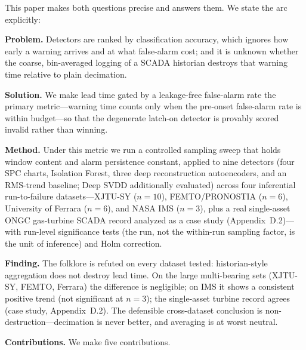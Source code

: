 \documentclass[IJPHM, 2026, 0]{PHMSociety}
\begin{document}
This paper makes both questions precise and answers them. We state the arc explicitly:

\textbf{Problem.} Detectors are ranked by classification accuracy, which ignores how early a warning arrives and at what false-alarm cost; and it is unknown whether the coarse, bin-averaged logging of a SCADA historian destroys that warning time relative to plain decimation.

\textbf{Solution.} We make lead time gated by a leakage-free false-alarm rate the primary metric---warning time counts only when the pre-onset false-alarm rate is within budget---so that the degenerate latch-on detector is provably scored invalid rather than winning.

\textbf{Method.} Under this metric we run a controlled sampling sweep that holds window content and alarm persistence constant, applied to nine detectors (four SPC charts, Isolation Forest, three deep reconstruction autoencoders, and an RMS-trend baseline; Deep SVDD additionally evaluated) across four inferential run-to-failure datasets---XJTU-SY ($n=10$), FEMTO/PRONOSTIA ($n=6$), University of Ferrara ($n=6$), and NASA IMS ($n=3$), plus a real single-asset ONGC gas-turbine SCADA record analyzed as a case study (Appendix~D.2)---with run-level significance tests (the run, not the within-run sampling factor, is the unit of inference) and Holm correction.

\textbf{Finding.} The folklore is refuted on every dataset tested: historian-style aggregation does not destroy lead time. On the large multi-bearing sets (XJTU-SY, FEMTO, Ferrara) the difference is negligible; on IMS it shows a consistent positive trend (not significant at $n=3$); the single-asset turbine record agrees (case study, Appendix~D.2). The defensible cross-dataset conclusion is non-destruction---decimation is never better, and averaging is at worst neutral.

\textbf{Contributions.} We make five contributions.
\end{document}

